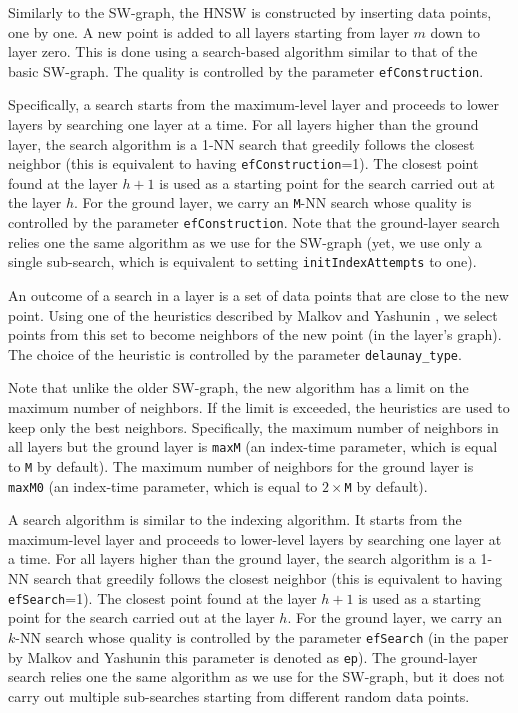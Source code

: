 \documentclass[runningheads,a4paper]{llncs}
\newcommand{\ttt}[1]{\texttt{#1}}
\newcommand{\knn}{$k$-NN }
\begin{document}
Similarly to the SW-graph, the HNSW is constructed by inserting data points, one by one.
A new point is added to all layers starting from layer $m$ down to layer zero.
This is done using a search-based algorithm similar to that of the basic SW-graph. 
The quality is controlled by the parameter \ttt{efConstruction}.

Specifically, a search starts from the maximum-level layer and proceeds to lower layers by searching one layer at a time.
For all layers higher than the ground layer, the search algorithm is a 1-NN search 
that greedily follows the closest neighbor (this is equivalent to having \ttt{efConstruction}=1).
The closest point found at the layer $h+1$ is used as a starting point for the search carried out at the layer $h$. 
For the ground layer, we carry an \ttt{M}-NN search whose quality is controlled by the parameter \ttt{efConstruction}.
Note that the ground-layer search relies one the same algorithm as we use for the SW-graph (yet,
we use only a single sub-search, which is equivalent to setting \ttt{initIndexAttempts} to one).

An outcome of a search in a layer is a set of data points that are close to the new point.
Using one of the heuristics described by Malkov and Yashunin \cite{Malkov2016},
we select points from this set to become neighbors of the new point (in the layer's graph).
The choice of the heuristic is controlled by the parameter \ttt{delaunay\_type}.

Note that unlike the older SW-graph, the new algorithm has a limit on the maximum number of neighbors.
If the limit is exceeded, the heuristics are used to keep only the best neighbors.
Specifically, the maximum number of neighbors in all layers but the ground layer is \ttt{maxM} (an index-time parameter,
which is equal to \ttt{M} by default).
The maximum number of neighbors for the ground layer is \ttt{maxM0} (an index-time parameter,
which is equal to $2\times$\ttt{M} by default). 

A search algorithm is similar to the indexing algorithm. 
It starts from the maximum-level layer and proceeds to lower-level layers by searching one layer at a time.
For all layers higher than the ground layer, the search algorithm is a 1-NN search 
that greedily follows the closest neighbor (this is equivalent to having \ttt{efSearch}=1).
The closest point found at the layer $h+1$ is used as a starting point for the search carried out at the layer $h$. 
For the ground layer, we carry an \knn search whose quality is controlled by the parameter \ttt{efSearch} (in the 
paper by Malkov and Yashunin \cite{Malkov2016} this parameter is denoted as \ttt{ep}).
The ground-layer search relies one the same algorithm as we use for the SW-graph,
but it does not carry out multiple sub-searches starting from different random data points.
\end{document}
